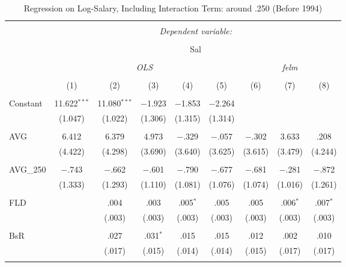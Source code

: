 
\begin{table}[H] \centering
  \caption{Regression on Log-Salary, Including Interaction Term: around .250 (Before 1994)} 
  \label{AVG250_B}
\tiny
\begin{tabular}{@{\extracolsep{5pt}}lcccccccc}
\\[-1.8ex]\hline
\hline \\[-1.8ex]
 & \multicolumn{8}{c}{\textit{Dependent variable:}} \\
\cline{2-9}
\\[-1.8ex] & \multicolumn{8}{c}{Sal} \\
\\[-1.8ex] & \multicolumn{5}{c}{\textit{OLS}} & \multicolumn{3}{c}{\textit{felm}} \\
\\[-1.8ex] & (1) & (2) & (3) & (4) & (5) & (6) & (7) & (8)\\
\hline \\[-1.8ex]
 Constant & 11.622$^{***}$ & 11.080$^{***}$ & $-$1.923 & $-$1.853 & $-$2.264 &  &  &  \\
  & (1.047) & (1.022) & (1.306) & (1.315) & (1.314) &  &  &  \\
  & & & & & & & & \\
 AVG & 6.412 & 6.379 & 4.973 & $-$.329 & $-$.057 & $-$.302 & 3.633 & .208 \\
  & (4.422) & (4.298) & (3.690) & (3.640) & (3.625) & (3.615) & (3.479) & (4.244) \\
  & & & & & & & & \\
 AVG\_250 & $-$.743 & $-$.662 & $-$.601 & $-$.790 & $-$.677 & $-$.681 & $-$.281 & $-$.872 \\
  & (1.333) & (1.293) & (1.110) & (1.081) & (1.076) & (1.074) & (1.016) & (1.261) \\
  & & & & & & & & \\
 FLD &  & .004 & .003 & .005$^{*}$ & .005 & .005 & .006$^{*}$ & .007$^{*}$ \\
  &  & (.003) & (.003) & (.003) & (.003) & (.003) & (.003) & (.003) \\
  & & & & & & & & \\
 BsR &  & .027 & .031$^{*}$ & .015 & .015 & .012 & .002 & .010 \\
  &  & (.017) & (.015) & (.014) & (.014) & (.015) & (.017) & (.017) \\
  & & & & & & & & \\

\end{tabular}
\end{table}
